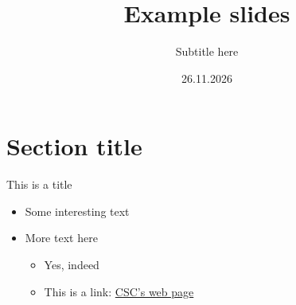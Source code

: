 \documentclass[aspectratio=169,12pt]{beamer}
\title{Example slides}
\subtitle{Subtitle here}
\date{26.11.2026}
\def\tightlist{}
\begin{document}
\section{Section title}\label{section-title}

\begin{frame}{This is a title}
\protect{}\label{this-is-a-title}
\begin{itemize}
\tightlist
\item
  Some interesting text
\item
  More text here

  \begin{itemize}
  \tightlist
  \item
    Yes, indeed
  \item
    This is a link: \href{https://www.csc.fi}{CSC's web page}
  \end{itemize}
\end{itemize}
\end{frame}    
\end{document}

